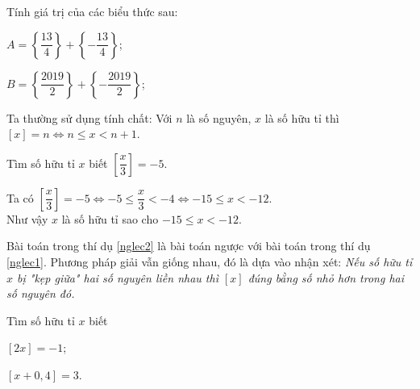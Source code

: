 \begin{vd}
Tính giá trị của các biểu thức sau:
\begin{listEX}[2]
	\item $A = \left\{ \dfrac{13}{4} \right\} + \left\{ - \dfrac{13}{4} \right\}$;
	\item $B = \left\{\dfrac{2019}{2}\right\} + \left\{ - \dfrac{2019}{2} \right\}$;
\end{listEX}
\end{vd}
\begin{dang}
Ta thường sử dụng tính chất: Với $n$ là số nguyên, $x$ là số hữu tỉ thì $\left[ x \right] = n \Leftrightarrow n \le x < n + 1$.
\end{dang}
\begin{vd}\label{nglec2}
	Tìm số hữu tỉ $x$ biết $\left[ \dfrac{x}{3} \right] =  - 5$.
	\loigiai
	{Ta có 
		$\left[ \dfrac{x}{3} \right] =  - 5 \Leftrightarrow  - 5 \le \dfrac{x}{3} <  - 4 \Leftrightarrow  - 15 \le x <  - 12$.\\
		Như vậy $x$ là số hữu tỉ sao cho $- 15 \le x <  - 12$.
		\begin{note}
			Bài toán trong thí dụ \ref{nglec2} là bài toán ngược với bài toán trong thí dụ \ref{nglec1}. Phương pháp giải vẫn giống nhau, đó là dựa vào nhận xét: {\em{Nếu số hữu tỉ $x$ bị "kẹp giữa" hai số nguyên liền nhau thì $[x]$ đúng bằng số nhỏ hơn trong hai số nguyên đó.}}
		\end{note}
	}
\end{vd}
\begin{vd}
Tìm số hữu tỉ $x$ biết
\begin{listEX}[2]
	\item $[2x]=-1$;
	\item $\left[ {x + 0,4} \right] = 3$.
\end{listEX}
\end{vd}
